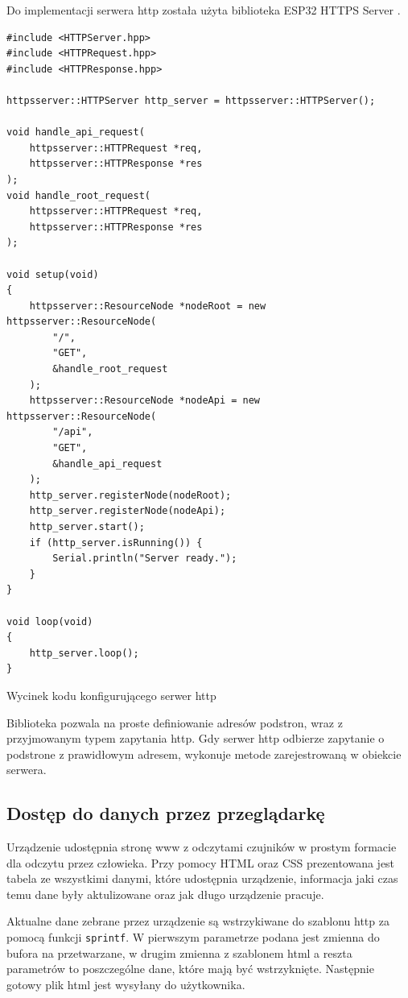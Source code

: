 \documentclass[12pt,a4paper]{article}
\begin{document}
Do implementacji serwera http została użyta biblioteka ESP32 HTTPS Server \cite{esp32-https-server-library}. 

\begin{code}[H]
\begin{verbatim}
#include <HTTPServer.hpp>
#include <HTTPRequest.hpp>
#include <HTTPResponse.hpp>

httpsserver::HTTPServer http_server = httpsserver::HTTPServer();

void handle_api_request(
    httpsserver::HTTPRequest *req, 
    httpsserver::HTTPResponse *res
);
void handle_root_request(
    httpsserver::HTTPRequest *req, 
    httpsserver::HTTPResponse *res
);

void setup(void)
{
    httpsserver::ResourceNode *nodeRoot = new httpsserver::ResourceNode(
        "/", 
        "GET", 
        &handle_root_request
    );
    httpsserver::ResourceNode *nodeApi = new httpsserver::ResourceNode(
        "/api", 
        "GET", 
        &handle_api_request
    );
    http_server.registerNode(nodeRoot);
    http_server.registerNode(nodeApi);
    http_server.start();
    if (http_server.isRunning()) {
        Serial.println("Server ready.");
    }
}

void loop(void)
{
    http_server.loop();
}
\end{verbatim}
\caption{Wycinek kodu konfigurującego serwer http}
\label{http-server-code-parts}
\end{code}

Biblioteka pozwala na proste definiowanie adresów podstron, wraz z przyjmowanym typem zapytania http. Gdy serwer http odbierze zapytanie o
podstrone z prawidłowym adresem, wykonuje metode zarejestrowaną w obiekcie serwera.

\subsection{Dostęp do danych przez przeglądarkę}

Urządzenie udostępnia stronę www z odczytami czujników w prostym formacie dla odczytu przez człowieka. 
Przy pomocy HTML oraz CSS prezentowana jest tabela ze wszystkimi danymi, które udostępnia urządzenie, informacja jaki czas temu
dane były aktulizowane oraz jak długo urządzenie pracuje.

Aktualne dane zebrane przez urządzenie są wstrzykiwane do szablonu http za pomocą funkcji \texttt{sprintf}. W pierwszym parametrze podana jest
zmienna do bufora na przetwarzane, w drugim zmienna z szablonem html a reszta parametrów to poszczególne dane, które mają być wstrzyknięte.
Następnie gotowy plik html jest wysyłany do użytkownika.
\end{document}
